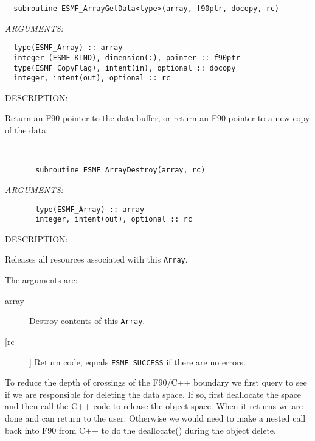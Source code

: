 \begin{verbatim}  subroutine ESMF_ArrayGetData<type>(array, f90ptr, docopy, rc) 
   \end{verbatim}{\em ARGUMENTS:}
\begin{verbatim}  type(ESMF_Array) :: array 
  integer (ESMF_KIND), dimension(:), pointer :: f90ptr 
  type(ESMF_CopyFlag), intent(in), optional :: docopy 
  integer, intent(out), optional :: rc 
   \end{verbatim}
{\sf DESCRIPTION:\\ }

 
   Return an F90 pointer to the data buffer, or return an F90 pointer 
   to a new copy of the data. 
    
 
\mbox{}\hrulefill\ 
 

\begin{verbatim}       subroutine ESMF_ArrayDestroy(array, rc)\end{verbatim}{\em ARGUMENTS:}
\begin{verbatim}       type(ESMF_Array) :: array
       integer, intent(out), optional :: rc\end{verbatim}
{\sf DESCRIPTION:\\ }


   Releases all resources associated with this {\tt Array}.
  
   The arguments are:
   \begin{description}
  
   \item[array]
   Destroy contents of this {\tt Array}.
  
   \item[[rc]]
   Return code; equals {\tt ESMF\_SUCCESS} if there are no errors.
  
   \end{description}
  
   To reduce the depth of crossings of the F90/C++ boundary we first
   query to see if we are responsible for deleting the data space. If so,
   first deallocate the space and then call the C++ code to release
   the object space. When it returns we are done and can return to the user.
   Otherwise we would need to make a nested call back into F90 from C++ to do
   the deallocate() during the object delete.
   
 
